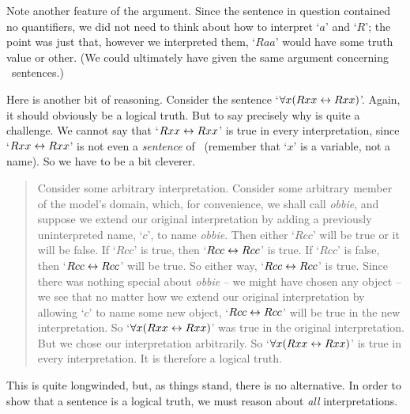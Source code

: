 Note another feature of the argument. Since the sentence in question contained no quantifiers, we did not need to think about how to interpret `$a$' and `$R$'; the point was just that, however we interpreted them, `$Raa$' would have some truth value or other. (We could ultimately have given the same argument concerning \TFL\ sentences.)

Here is another bit of reasoning. Consider the sentence `$\forall x(Rxx\leftrightarrow Rxx)$'. Again, it should obviously be a logical truth. But to say precisely why is quite a challenge. We cannot say that `$Rxx \leftrightarrow Rxx$' is true in every interpretation, since `$Rxx \leftrightarrow Rxx$' is not even a \emph{sentence} of \FOL\ (remember that `$x$' is a variable, not a name). So we have to be a bit cleverer. 
	\begin{quote}
		Consider some arbitrary interpretation. Consider some arbitrary member of the model's domain, which, for convenience, we shall call \emph{obbie}, and suppose we extend our original interpretation by adding a previously uninterpreted name, `$c$', to name \emph{obbie}. Then either `$Rcc$' will be true or it will be false. If `$Rcc$' is true, then `$Rcc \leftrightarrow Rcc$' is true. If `$Rcc$' is false, then `$Rcc \leftrightarrow Rcc$' will be true. So either way, `$Rcc \leftrightarrow Rcc$' is true. Since there was nothing special about \emph{obbie} – we might have chosen any object – we see that no matter how we extend our original interpretation by allowing `$c$' to name some new object, `$Rcc \leftrightarrow Rcc$' will be true in the new interpretation. So `$\forall x (Rxx \leftrightarrow Rxx)$' was true in the original interpretation. But we chose our interpretation arbitrarily. So `$\forall x (Rxx \leftrightarrow Rxx)$' is true in every interpretation. It is therefore a logical truth.
	\end{quote}
This is quite longwinded, but, as things stand, there is no alternative. In order to show that a sentence is a logical truth, we must reason about \emph{all} interpretations. 


